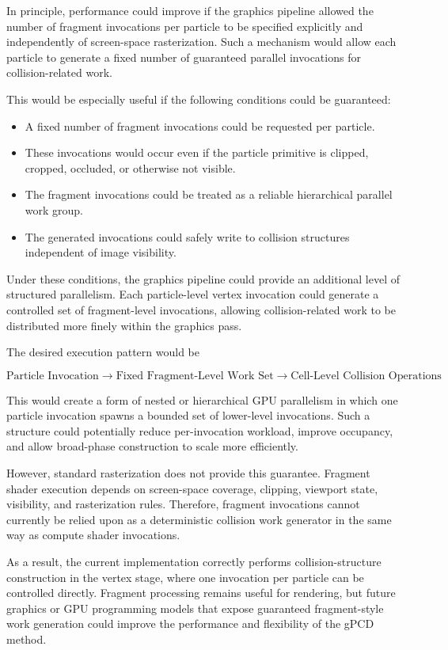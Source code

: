 \documentclass{article}
\begin{document}
In principle, performance could improve if the graphics pipeline allowed the number of fragment invocations per particle to be specified explicitly and independently of screen-space rasterization. Such a mechanism would allow each particle to generate a fixed number of guaranteed parallel invocations for collision-related work.

This would be especially useful if the following conditions could be guaranteed:

\begin{itemize}
    \item A fixed number of fragment invocations could be requested per particle.
    \item These invocations would occur even if the particle primitive is clipped, cropped, occluded, or otherwise not visible.
    \item The fragment invocations could be treated as a reliable hierarchical parallel work group.
    \item The generated invocations could safely write to collision structures independent of image visibility.
\end{itemize}

Under these conditions, the graphics pipeline could provide an additional level of structured parallelism. Each particle-level vertex invocation could generate a controlled set of fragment-level invocations, allowing collision-related work to be distributed more finely within the graphics pass.

The desired execution pattern would be

\[
\text{Particle Invocation}
\rightarrow
\text{Fixed Fragment-Level Work Set}
\rightarrow
\text{Cell-Level Collision Operations}
\]

This would create a form of nested or hierarchical GPU parallelism in which one particle invocation spawns a bounded set of lower-level invocations. Such a structure could potentially reduce per-invocation workload, improve occupancy, and allow broad-phase construction to scale more efficiently.

However, standard rasterization does not provide this guarantee. Fragment shader execution depends on screen-space coverage, clipping, viewport state, visibility, and rasterization rules. Therefore, fragment invocations cannot currently be relied upon as a deterministic collision work generator in the same way as compute shader invocations.

As a result, the current implementation correctly performs collision-structure construction in the vertex stage, where one invocation per particle can be controlled directly. Fragment processing remains useful for rendering, but future graphics or GPU programming models that expose guaranteed fragment-style work generation could improve the performance and flexibility of the gPCD method.
\end{document}
